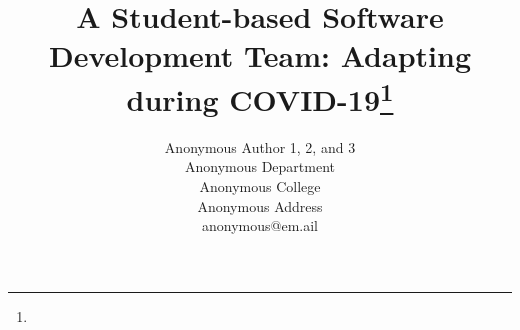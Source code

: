 \documentclass{article}
\title{A Student-based Software Development Team: Adapting during COVID-19\footnote{\protect}}
\author{
Anonymous Author 1, 2, and 3\\
Anonymous Department\\
Anonymous College\\
Anonymous Address\\
anonymous@em.ail\\


}
\begin{document}
\maketitle

\begin{abstract}
 
\end{abstract}


% 





\medskip



\end{document}
